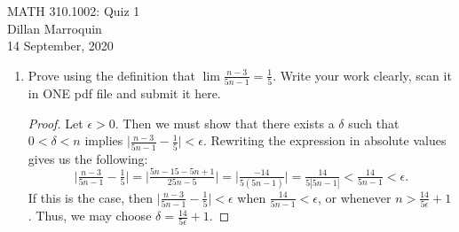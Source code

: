 \documentclass{article}
\begin{document}
    \noindent MATH 310.1002: Quiz 1\\
    Dillan Marroquin\\
    14 September, 2020

    \begin{enumerate}
        \item Prove using the definition that $\lim\frac{n-3}{5n-1}=\frac{1}{5}$. Write your work clearly, scan it in ONE pdf file and submit it here.
            
            \begin{proof}
                Let $\epsilon > 0$. Then we must show that there exists a $\delta$ such that $0 < \delta < n$ implies $\Big|\tfrac{n-3}{5n-1} - \tfrac{1}{5}\Big| < \epsilon$. Rewriting the expression in absolute values gives us the following:
                    \[\Big|\tfrac{n-3}{5n-1} - \tfrac{1}{5}\Big| = \Big|\tfrac{5n-15-5n+1}{25n-5}\Big| = \Big|\tfrac{-14}{5(5n-1)}\Big| = \tfrac{14}{5|5n-1|}< \tfrac{14}{5n-1} < \epsilon.\]
               If this is the case, then $\Big|\tfrac{n-3}{5n-1} - \tfrac{1}{5}\Big| < \epsilon$ when $\tfrac{14}{5n-1} < \epsilon$, or whenever $n > \tfrac{14}{5\epsilon} + 1$. Thus, we may choose $\delta = \tfrac{14}{5\epsilon} + 1$.
                
            \end{proof}

    \end{enumerate}
\end{document}
